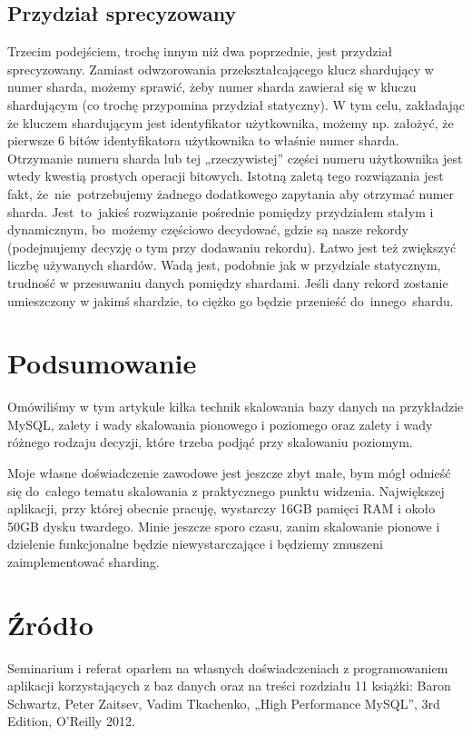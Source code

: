 \documentclass[a4paper,12pt]{article}
\begin{document}
\subsection{Przydział sprecyzowany}

Trzecim podejściem, trochę innym niż dwa poprzednie, jest przydział sprecyzowany. Zamiast odwzorowania przekształcającego klucz shardujący w numer sharda, możemy sprawić, żeby numer sharda zawierał się w kluczu shardującym (co trochę przypomina przydział statyczny). W tym celu, zakładając że kluczem shardującym jest identyfikator użytkownika, możemy np. założyć, że pierwsze 6 bitów identyfikatora użytkownika to właśnie numer sharda. Otrzymanie numeru sharda lub tej „rzeczywistej” części numeru użytkownika jest wtedy kwestią prostych operacji bitowych. Istotną zaletą tego rozwiązania jest fakt, że~nie~potrzebujemy żadnego dodatkowego zapytania aby otrzymać numer sharda. Jest~to~jakieś rozwiązanie pośrednie pomiędzy przydziałem stałym i dynamicznym, bo~możemy częściowo decydować, gdzie są nasze rekordy (podejmujemy decyzję o tym przy dodawaniu rekordu). Łatwo jest też zwiększyć liczbę używanych shardów. Wadą jest, podobnie jak w przydziale statycznym, trudność w przesuwaniu danych pomiędzy shardami. Jeśli dany rekord zostanie umieszczony w jakimś shardzie, to ciężko go będzie przenieść do~innego~shardu.

\section{Podsumowanie}

Omówiliśmy w tym artykule kilka technik skalowania bazy danych na przykładzie MySQL, zalety i wady skalowania pionowego i poziomego oraz zalety i wady różnego rodzaju decyzji, które trzeba podjąć przy skalowaniu poziomym.

Moje własne doświadczenie zawodowe jest jeszcze zbyt małe, bym mógł odnieść się do~całego tematu skalowania z praktycznego punktu widzenia. Największej aplikacji, przy której obecnie pracuję, wystarczy 16GB pamięci RAM i około 50GB dysku twardego. Minie jeszcze sporo czasu, zanim skalowanie pionowe i dzielenie funkcjonalne będzie niewystarczające i będziemy zmuszeni zaimplementować sharding.

\section{Źródło}

Seminarium i referat oparłem na własnych doświadczeniach z programowaniem aplikacji korzystających z baz danych oraz na treści rozdziału 11 książki: Baron Schwartz, Peter Zaitsev, Vadim Tkachenko, „High Performance MySQL”, 3rd Edition, O'Reilly 2012.
\end{document}
